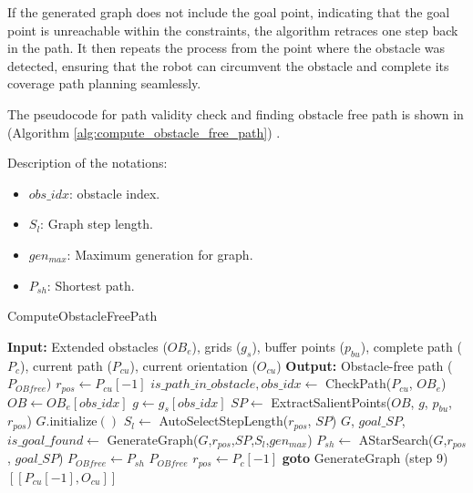 If the generated graph does not include the goal point, indicating that the goal point is unreachable within the constraints, the algorithm retraces one step back in the path. It then repeats the process from the point where the obstacle was detected, ensuring that the robot can circumvent the obstacle and complete its coverage path planning seamlessly.

\vspace*{6mm}  

The pseudocode for path validity check and finding obstacle free path is shown in (Algorithm \autoref{alg:compute_obstacle_free_path}) .

Description of the notations:
\begin{multicols}{2}
\begin{itemize}[noitemsep,topsep=0pt]
    \item $obs\_idx$: obstacle index.
    \item $S_l$: Graph step length.
    \item $gen_{max}$: Maximum generation for graph.
    \item $P_{sh}$: Shortest path.
\end{itemize}
\end{multicols}

\begin{algorithm}[H]
    \caption{ComputeObstacleFreePath}
    \label{alg:compute_obstacle_free_path}
    \begin{algorithmic}[1]
    \Statex \textbf{Input:} Extended obstacles ($OB_e$), grids ($g_s$), buffer points ($p_{bu}$), complete path ($P_c$), current path ($P_{cu}$), current orientation ($O_{cu}$)
    \Statex \textbf{Output:} Obstacle-free path ($P_{OB free}$)
    \newline
    \State $r_{pos} \leftarrow P_{cu}[-1]$
    \State $is\_path\_in\_obstacle, obs\_idx \leftarrow$ CheckPath($P_{cu}$, $OB_e$)
        \State $OB\leftarrow OB_e[obs\_idx]$
        \State $g \leftarrow g_s[obs\_idx]$
        \State $SP \leftarrow$ ExtractSalientPoints($OB$, $g$, $p_{bu}$, $r_{pos}$)
        \State $G.\text{initialize}()$
        \State $S_l \leftarrow$ AutoSelectStepLength($r_{pos}$, $SP$)
        \State $G$, $goal\_SP$, $is\_goal\_found \leftarrow$ GenerateGraph($G$,$r_{pos}$,$SP$,$S_l$,$gen_{max}$)
            \State $P_{sh} \leftarrow$ AStarSearch($G$,$r_{pos}$, $goal\_SP$)
            \State $P_{OB free} \leftarrow P_{sh}$
            \State \Return $P_{OB free}$
        \Else
            \State $r_{pos} \leftarrow P_c[-1]$ 
            \State \textbf{goto} GenerateGraph (step 9)
        \EndIf
    \Else
        \State \Return $[[P_{cu}[-1], O_{cu}]]$
    \EndIf
    \end{algorithmic}
    \end{algorithm}


